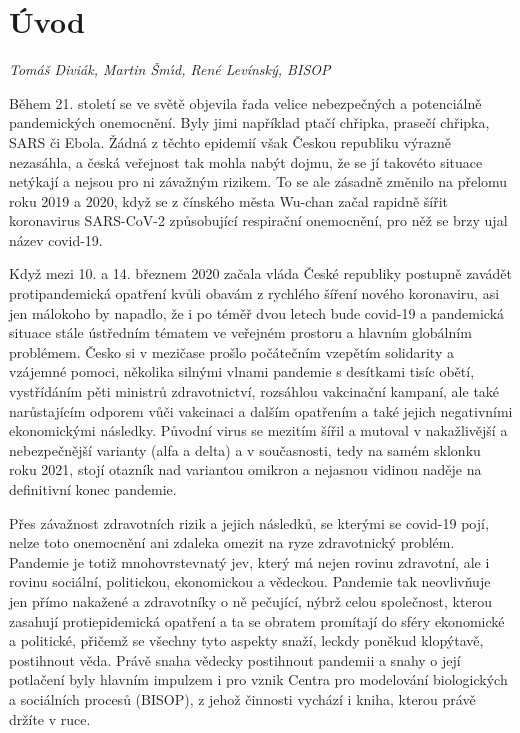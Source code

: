 \chapter*{Úvod}

\textit{Tomáš Diviák, Martin \v Sm\'\i d, René Levínský, BISOP}
\vspace{15mm}

Během 21. století se ve světě objevila řada velice nebezpečných a potenciálně pandemických onemocnění. Byly jimi například ptačí chřipka, prasečí chřipka, SARS či Ebola. Žádná z těchto epidemií však Českou republiku výrazně nezasáhla, a česká veřejnost tak mohla nabýt dojmu, že se jí takovéto situace netýkají a nejsou pro ni závažným rizikem. To se ale zásadně změnilo na přelomu roku 2019 a 2020, když se z čínského města Wu-chan začal rapidně šířit koronavirus SARS-CoV-2 způsobující respirační onemocnění, pro něž se brzy ujal název covid-19.

Když mezi 10. a 14. březnem 2020 začala vláda České republiky postupně zavádět protipandemická opatření kvůli obavám z rychlého šíření nového koronaviru, asi jen málokoho by napadlo, že i po téměř dvou letech bude covid-19 a pandemická situace stále ústředním tématem ve veřejném prostoru a hlavním globálním problémem. Česko si v mezičase prošlo počátečním vzepětím solidarity a vzájemné pomoci, několika silnými vlnami pandemie s desítkami tisíc obětí, vystřídáním pěti ministrů zdravotnictví, rozsáhlou vakcinační kampaní, ale také narůstajícím odporem vůči vakcinaci a dalším opatřením a také jejich negativními ekonomickými následky. Původní virus se mezitím šířil a mutoval v nakažlivější a nebezpečnější varianty (alfa a delta) a v současnosti, tedy na samém sklonku roku 2021, stojí otazník nad variantou omikron a nejasnou vidinou naděje na definitivní konec pandemie.

Přes závažnost zdravotních rizik a jejich následků, se kterými se covid-19 pojí, nelze toto onemocnění ani zdaleka omezit na ryze zdravotnický problém. Pandemie je totiž mnohovrstevnatý jev, který má nejen rovinu zdravotní, ale i rovinu sociální, politickou, ekonomickou a vědeckou. Pandemie tak neovlivňuje jen přímo nakažené a zdravotníky o ně pečující, nýbrž celou společnost, kterou zasahují protiepidemická opatření a ta se obratem promítají do sféry ekonomické a politické, přičemž se všechny tyto aspekty snaží, leckdy poněkud klopýtavě, postihnout věda. Právě snaha vědecky postihnout pandemii a snahy o její potlačení byly hlavním impulzem i pro vznik Centra pro modelování biologických a sociálních procesů (BISOP), z jehož činnosti vychází i kniha, kterou právě držíte v ruce.

